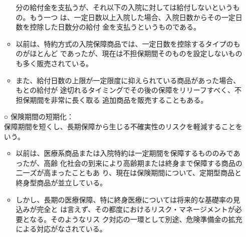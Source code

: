 \documentclass[report,gutter=10mm,fore-edge=10mm,uplatex,dvipdfmx]{jlreq}
\begin{document}
\begin{itemize}
\begin{itemize}
 分の給付金を支払うが、それ以下の入院に対しては給付しないというもの。もう一つ
 は、一定日数以上入院した場合、入院日数からその一定日数を控除した日数分の給付
 金を支払うというものである。
 \item 以前は、特約方式の入院保障商品では、一定日数を控除するタイプのものがほとんど
 であったが、現在は不担保期間そのものを設定しないものも多く販売されている。
 \item また、給付日数の上限が一定限度に抑えられている商品があった場合、もとの給付が
 途切れるタイミングでその後の保障をリリーフすべく、不担保期間を非常に長く取る
 追加商品を販売することもある。
\end{itemize}
 \item [○] 保険期間の短期化：\\
 保障期間を短くし、長期保障から生じる不確実性のリスクを軽減することをいう。
\begin{itemize}
 \item 以前は、医療系商品または入院特約は一定期間を保障するもののみであったが、高齢
 化社会の到来により高齢期または終身まで保障する商品の二一ズが高まったこともあ
 り、現在は保険期間について、定期型商品と終身型商品が並立している。
 \item しかし、長期の医療保障、特に終身医療については将来的な基礎率の見込みが完全と
 は言えず、その都度におけるリスク・マネージメントが必要となる。そのようなリス
 ク対応の一環として別途、危険準備金の拡充による対応がなされている。
\end{itemize}
\end{itemize}
\end{document}
